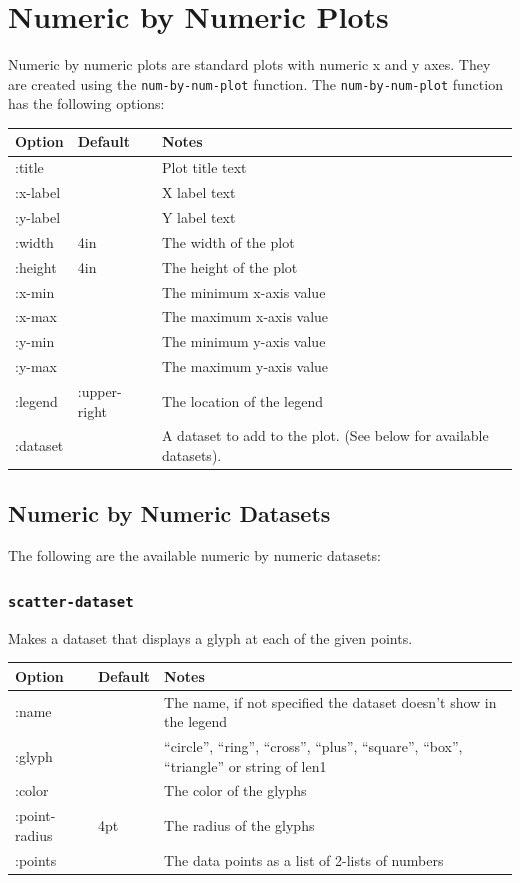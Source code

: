 \documentclass{article}
\begin{document}
\section{\label{sect:num-by-num} Numeric by Numeric Plots}

Numeric by numeric plots are standard plots with numeric x and y
axes.  They are created using the {\tt num-by-num-plot} function.  The
{\tt num-by-num-plot} function has the following options:

\begin{center}
\begin{tabular}{lll}
Option & Default & Notes \\
\hline
:title & & Plot title text\\
:x-label & & X label text\\
:y-label & & Y label text\\
:width & 4in & The width of the plot\\
:height & 4in & The height of the plot\\
:x-min & & The minimum x-axis value\\
:x-max & & The maximum x-axis value\\
:y-min & & The minimum y-axis value\\
:y-max & & The maximum y-axis value\\
:legend & :upper-right & The location of the legend \\
:dataset & & A dataset to add to the plot.  (See below for available
datasets).\\
\end{tabular}
\end{center}

\subsection{Numeric by Numeric Datasets}

The following are the available numeric by numeric datasets:

\subsubsection{\tt scatter-dataset}

Makes a dataset that displays a glyph at each of the given points.

\begin{center}
\begin{tabular}{lll}
Option & Default & Notes \\
\hline
:name & & The name, if not specified the dataset doesn't show in
the legend\\
:glyph & & ``circle'', ``ring'', ``cross'', ``plus'', ``square'',
``box'', ``triangle'' or string of len1\\
:color & & The color of the glyphs\\
:point-radius & 4pt & The radius of the glyphs\\
:points & & The data points as a list of 2-lists of numbers\\
\end{tabular}
\end{center}
\end{document}
